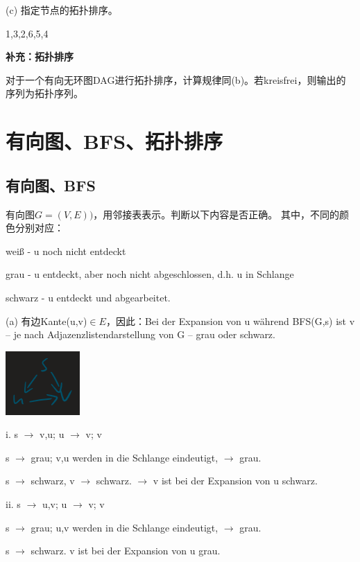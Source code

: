 \documentclass[a4paper]{article}    %
\begin{document}
(c)	指定节点的拓扑排序。

{1,3,2,6,5,4}

\noindent\textbf{补充：拓扑排序}

对于一个有向无环图DAG进行拓扑排序，计算规律同(b)。若kreisfrei，则输出的序列为拓扑序列。



\section{有向图、BFS、拓扑排序}

\subsection{有向图、BFS}

\noindent 有向图$G=(V,E))$，用邻接表表示。判断以下内容是否正确。
其中，不同的颜色分别对应：

weiß - u noch nicht entdeckt

grau - u entdeckt, aber noch nicht abgeschlossen, d.h. u in Schlange

schwarz - u entdeckt und abgearbeitet.


(a) 有边Kante(u,v)$\in E$，因此：Bei der Expansion von u während BFS(G,s) ist v – je nach Adjazenzlistendarstellung von G – grau oder schwarz.

\begin{center}
    \includegraphics[scale=0.6]{3.png}
\end{center}

i. s $\rightarrow$ v,u; u $\rightarrow$ v; v 

\indent\indent s $\rightarrow$ grau; v,u werden in die Schlange eindeutigt, $\rightarrow$ grau.

\indent\indent s $\rightarrow$ schwarz, v $\rightarrow$ schwarz. $\rightarrow$ v ist bei der Expansion von u schwarz.

ii. s $\rightarrow$ u,v; u $\rightarrow$ v; v

\indent\indent s $\rightarrow$ grau; u,v werden in die Schlange eindeutigt, $\rightarrow$ grau.

\indent\indent s $\rightarrow$ schwarz. v ist bei der Expansion von u grau.
\end{document}
